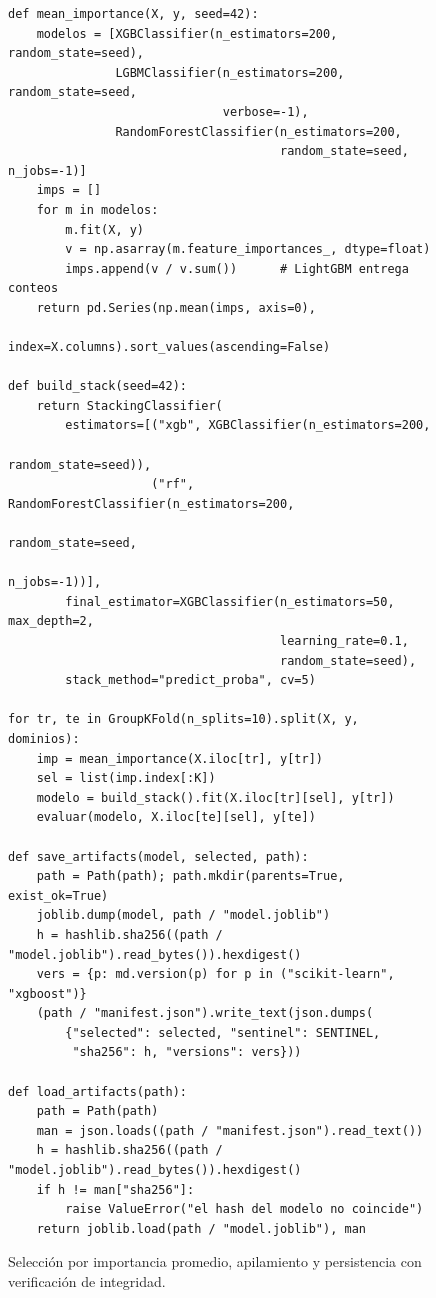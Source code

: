 \begin{figure}[ht]
\begin{lstlisting}
def mean_importance(X, y, seed=42):
    modelos = [XGBClassifier(n_estimators=200, random_state=seed),
               LGBMClassifier(n_estimators=200, random_state=seed,
                              verbose=-1),
               RandomForestClassifier(n_estimators=200,
                                      random_state=seed, n_jobs=-1)]
    imps = []
    for m in modelos:
        m.fit(X, y)
        v = np.asarray(m.feature_importances_, dtype=float)
        imps.append(v / v.sum())      # LightGBM entrega conteos
    return pd.Series(np.mean(imps, axis=0),
                     index=X.columns).sort_values(ascending=False)

def build_stack(seed=42):
    return StackingClassifier(
        estimators=[("xgb", XGBClassifier(n_estimators=200,
                                          random_state=seed)),
                    ("rf", RandomForestClassifier(n_estimators=200,
                                                  random_state=seed,
                                                  n_jobs=-1))],
        final_estimator=XGBClassifier(n_estimators=50, max_depth=2,
                                      learning_rate=0.1,
                                      random_state=seed),
        stack_method="predict_proba", cv=5)

for tr, te in GroupKFold(n_splits=10).split(X, y, dominios):
    imp = mean_importance(X.iloc[tr], y[tr])
    sel = list(imp.index[:K])
    modelo = build_stack().fit(X.iloc[tr][sel], y[tr])
    evaluar(modelo, X.iloc[te][sel], y[te])

def save_artifacts(model, selected, path):
    path = Path(path); path.mkdir(parents=True, exist_ok=True)
    joblib.dump(model, path / "model.joblib")
    h = hashlib.sha256((path / "model.joblib").read_bytes()).hexdigest()
    vers = {p: md.version(p) for p in ("scikit-learn", "xgboost")}
    (path / "manifest.json").write_text(json.dumps(
        {"selected": selected, "sentinel": SENTINEL,
         "sha256": h, "versions": vers}))

def load_artifacts(path):
    path = Path(path)
    man = json.loads((path / "manifest.json").read_text())
    h = hashlib.sha256((path / "model.joblib").read_bytes()).hexdigest()
    if h != man["sha256"]:
        raise ValueError("el hash del modelo no coincide")
    return joblib.load(path / "model.joblib"), man
\end{lstlisting}
\caption{Selección por importancia promedio, apilamiento y persistencia con verificación de integridad.}
\label{lst:entrenamiento}
\end{figure}

